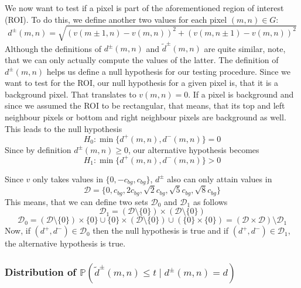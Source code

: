 \documentclass[a4paper,12pt]{article}
\theoremstyle{plain}
\theoremstyle{definition}
\theoremstyle{remark}
\begin{document}
We now want to test if a pixel is part of the aforementioned region of interest (ROI). To do this, we define another two values for each pixel $(m, n) \in G$:
\begin{equation}\label{d}
	d^\pm(m, n) = \sqrt{(v(m \pm 1, n) - v(m, n))^2 + (v(m, n \pm 1) - v(m, n))^2}
\end{equation}
Although the definitions of $d^\pm(m, n)$ and $\tilde{d}^\pm(m, n)$ are quite similar, note, that we can only actually compute the values of the latter. The definition of $d^\pm(m, n)$ helps us define a null hypothesis for our testing procedure. Since we want to test for the ROI, our null hypothesis for a given pixel is, that it is a background pixel. That translates to $v(m, n) = 0$. If a pixel is background and since we assumed the ROI to be rectangular, that means, that its top and left neighbour pixels or bottom and right neighbour pixels are background as well. This leads to the null hypothesis
\begin{equation}
	H_0 : \min\{ d^+(m, n), d^-(m, n) \} = 0
\end{equation}
Since by definition $d^\pm(m, n) \geq 0$, our alternative hypothesis becomes
\begin{equation}
	H_1 : \min\{ d^+(m, n), d^-(m, n) \} > 0
\end{equation}

Since $v$ only takes values in $\{ 0, -c_{bg}, c_{bg} \}$, $d^\pm$ also can only attain values in
\begin{equation*}
	\mathcal{D} = \{ 0, c_{bg}, 2 c_{bg}, \sqrt{2} c_{bg}, \sqrt{5} c_{bg}, \sqrt{8} c_{bg} \}
\end{equation*}
This means, that we can define two sets $\mathcal{D}_0$ and $\mathcal{D}_1$ as follows
\begin{equation*}
	\mathcal{D}_1 = ( \mathcal{D} \setminus \{ 0 \} ) \times ( \mathcal{D} \setminus \{ 0 \} )
\end{equation*}
\begin{equation*}
	\mathcal{D}_0 = ( \mathcal{D} \setminus \{ 0 \} ) \times \{ 0 \} \cup \{ 0 \} \times ( \mathcal{D} \setminus \{ 0 \} ) \cup ( \{ 0 \} \times \{ 0 \} ) = ( \mathcal{D} \times \mathcal{D} ) \setminus \mathcal{D}_1
\end{equation*}
Now, if $(d^+, d^-) \in \mathcal{D}_0$ then the null hypothesis is true and if $(d^+, d^-) \in \mathcal{D}_1$, the alternative hypothesis is true.

\subsubsection{Distribution of $\mathbb{P}(\tilde{d}^\pm(m, n) \leq t \mid d^\pm(m, n) = d)$}
\end{document}
